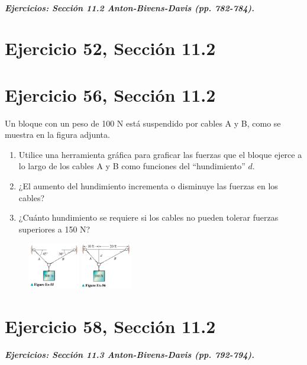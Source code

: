 \documentclass[11pt,letterpaper]{article}
\begin{document}
\subparagraph{Ejercicios: Sección 11.2 Anton-Bivens-Davis (pp. 782-784).}

\section{Ejercicio 52, Sección 11.2}

\section{Ejercicio 56, Sección 11.2}
Un bloque con un peso de 100 N está suspendido por cables A y B, como se muestra en la figura adjunta.
\begin{enumerate}
    \item Utilice una herramienta gráfica para graficar las fuerzas que el bloque ejerce a lo largo de los cables A y B como funciones del ``hundimiento'' $d$.
    \item ¿El aumento del hundimiento incrementa o disminuye las fuerzas en los cables?
    \item ¿Cuánto hundimiento se requiere si los cables no pueden tolerar fuerzas superiores a 150 N?
\end{enumerate}

\begin{figure}[h]
    \centering
    \includegraphics[width=0.2\textwidth]{imagenes/Figure_Ex-55.png}
    \hspace{5cm}
    \includegraphics[width=0.2\textwidth]{imagenes/Figure_Ex-56.png}
\end{figure}


\section{Ejercicio 58, Sección 11.2}


\subparagraph{Ejercicios: Sección 11.3 Anton-Bivens-Davis (pp. 792-794).}
\end{document}
